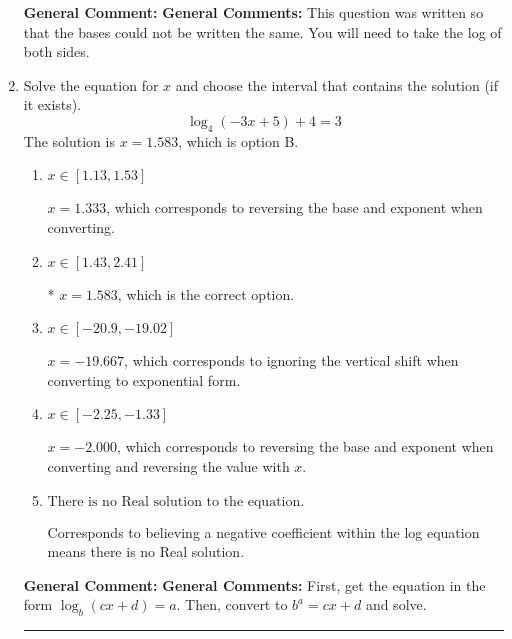 \documentclass{extbook}[14pt]
\newcommand{\litem}[1]{\item #1

\rule{\textwidth}{0.4pt}}
\begin{document}
\begin{enumerate}
{\textbf{General Comment:} \textbf{General Comments:} This question was written so that the bases could not be written the same. You will need to take the log of both sides.
}
\litem{
Solve the equation for $x$ and choose the interval that contains the solution (if it exists).
\[ \log_{4}{(-3x+5)}+4 = 3 \]
The solution is \( x = 1.583 \), which is option B.\begin{enumerate}[label=\Alph*.]
\item \( x \in [1.13, 1.53] \)

$x = 1.333$, which corresponds to reversing the base and exponent when converting.
\item \( x \in [1.43, 2.41] \)

* $x = 1.583$, which is the correct option.
\item \( x \in [-20.9, -19.02] \)

$x = -19.667$, which corresponds to ignoring the vertical shift when converting to exponential form.
\item \( x \in [-2.25, -1.33] \)

$x = -2.000$, which corresponds to reversing the base and exponent when converting and reversing the value with $x$.
\item \( \text{There is no Real solution to the equation.} \)

Corresponds to believing a negative coefficient within the log equation means there is no Real solution.
\end{enumerate}

\textbf{General Comment:} \textbf{General Comments:} First, get the equation in the form $\log_b{(cx+d)} = a$. Then, convert to $b^a = cx+d$ and solve.
}
\end{enumerate}
\end{document}

